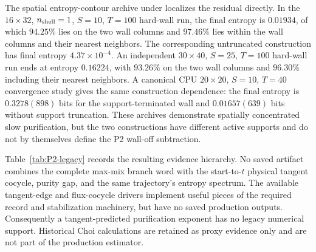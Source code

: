 \documentclass[aps,prx,twocolumn,floatfix,nofootinbib,superscriptaddress,longbibliography]{revtex4-2}
\begin{document}
The spatial entropy-contour archive under
 localizes
the residual directly.  In the $16\times32$, $n_{\rm shell}=1$, $S=10$, $T=100$ hard-wall
run, the final entropy is $0.01934$, of which $94.25\%$ lies on the two wall columns and
$97.46\%$ lies within the wall columns and their nearest neighbors.  The corresponding
untruncated construction has final entropy $4.37\times10^{-4}$.  An independent
$30\times40$, $S=25$, $T=100$ hard-wall run ends at entropy $0.16224$, with $93.26\%$
on the two wall columns and $96.30\%$ including their nearest neighbors.  A canonical CPU
$20\times20$, $S=10$, $T=40$ convergence study gives the same construction dependence:
the final entropy is $0.3278(898)$ bits for the support-terminated wall and $0.01657(639)$
bits without support truncation.  These archives demonstrate spatially concentrated slow
purification, but the two constructions have different active supports and do not by
themselves define the P2 wall-off subtraction.

Table~\ref{tab:P2-legacy} records the resulting evidence hierarchy.  No saved artifact
combines the complete max-mix branch word with the start-to-$t$ physical tangent cocycle,
purity gap, and the same trajectory's entropy spectrum.  The available tangent-edge and
flux-cocycle drivers implement useful pieces of the required record and stabilization
machinery, but have no saved production outputs.  Consequently a tangent-predicted
purification exponent has no legacy numerical support.  Historical Choi calculations are
retained as proxy evidence only and are not part of the production estimator.
\end{document}
